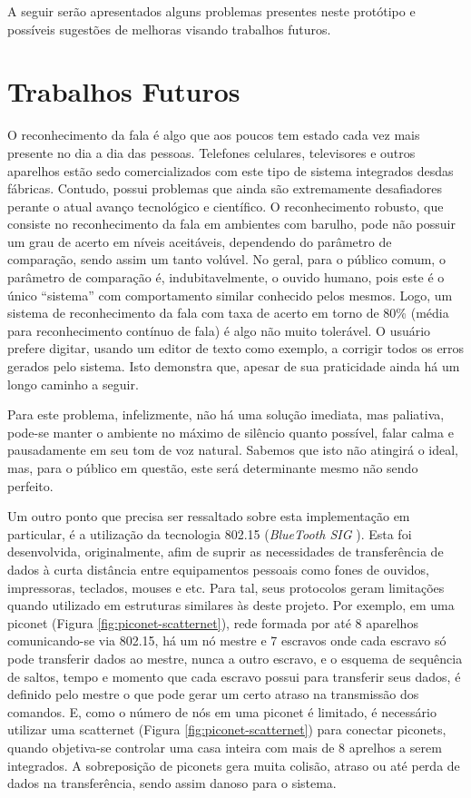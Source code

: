 \documentclass[12pt,a4paper,oneside]{report}
\begin{document}
A seguir serão apresentados alguns problemas presentes neste protótipo e possíveis sugestões de melhoras visando trabalhos futuros.

\section{Trabalhos Futuros}

O reconhecimento da fala é algo que aos poucos tem estado cada vez mais presente no dia a dia das pessoas. Telefones celulares, televisores e outros aparelhos estão sedo comercializados com este tipo de sistema integrados desdas fábricas. Contudo, possui problemas que ainda são extremamente desafiadores perante o atual avanço tecnológico e científico. O reconhecimento robusto, que consiste no reconhecimento da fala em ambientes com barulho, pode não possuir um grau de acerto em níveis aceitáveis, dependendo do parâmetro de comparação, sendo assim um tanto volúvel. No geral, para o público comum, o parâmetro de comparação é, indubitavelmente, o ouvido humano, pois este é o único ``sistema'' com comportamento similar conhecido pelos mesmos. Logo, um sistema de reconhecimento da fala com taxa de acerto em torno de 80\% (média para reconhecimento contínuo de fala) é algo não muito tolerável. O usuário prefere digitar, usando um editor de texto como exemplo, a corrigir todos os erros gerados pelo sistema. Isto demonstra que, apesar de sua praticidade ainda há um longo caminho a seguir.

Para este problema, infelizmente, não há uma solução imediata, mas paliativa, pode-se manter o ambiente no máximo de silêncio quanto possível, falar calma e pausadamente em seu tom de voz natural. Sabemos que isto não atingirá o ideal, mas, para o público em questão, este será determinante mesmo não sendo perfeito.

Um outro ponto que precisa ser ressaltado sobre esta implementação em particular, é a utilização da tecnologia 802.15 (\emph{BlueTooth SIG} \cite{bluetooth}). Esta foi desenvolvida, originalmente, afim de suprir as necessidades de transferência de dados à curta distância entre equipamentos pessoais como fones de ouvidos, impressoras, teclados, mouses e etc. Para tal, seus protocolos geram limitações quando utilizado em estruturas similares às deste projeto. Por exemplo, em uma piconet (Figura \ref{fig:piconet-scatternet}), rede formada por até 8 aparelhos comunicando-se via 802.15, há um nó mestre e 7 escravos onde cada escravo só pode transferir dados ao mestre, nunca a outro escravo, e o esquema de sequência de saltos, tempo e momento que cada escravo possui para transferir seus dados, é definido pelo mestre o que pode gerar um certo atraso na transmissão dos comandos. E, como o número de nós em uma piconet é limitado, é necessário utilizar uma scatternet (Figura \ref{fig:piconet-scatternet}) para conectar piconets, quando objetiva-se controlar uma casa inteira com mais de 8 aprelhos a serem integrados. A sobreposição de piconets gera muita colisão, atraso ou até perda de dados na transferência, sendo assim danoso para o sistema.
\end{document}
